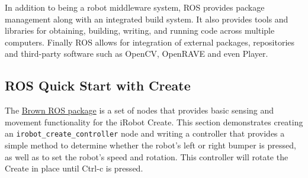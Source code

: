 In addition to being a robot middleware system, ROS provides package
management along with an integrated build system. It also provides
tools and libraries for obtaining, building, writing, and running code
across multiple computers. Finally ROS allows for integration of
external packages, repositories and third-party software such as
OpenCV, OpenRAVE and even Player.

\subsection{ROS Quick Start with Create}
\label{sec:ros_quickstart}

The \href{http://code.google.com/p/brown-ros-pkg/}{Brown ROS package} is a set of nodes that provides basic sensing and movement functionality for the iRobot Create. This section demonstrates creating an \texttt{irobot\_create\_controller} node and writing a controller that provides a simple method to determine whether the robot's left or right bumper is pressed, as well as to set the robot's speed and rotation. This controller will rotate the Create in place until Ctrl-c is pressed.

